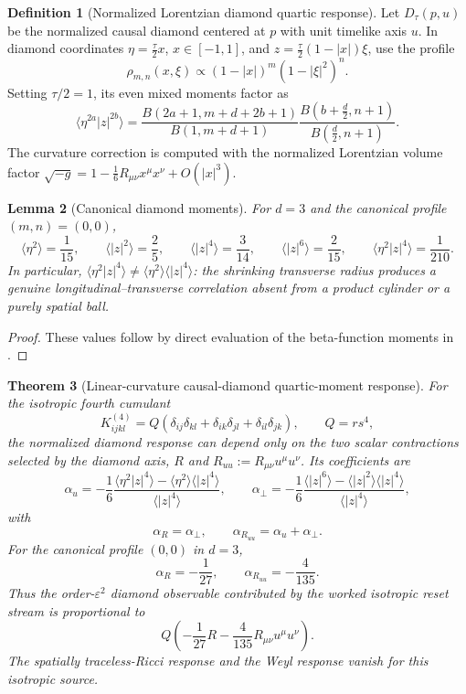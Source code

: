 \documentclass[11pt]{article}
\newtheorem{theorem}{Theorem}[section]
\newtheorem{lemma}[theorem]{Lemma}
\theoremstyle{definition}
\newtheorem{definition}[theorem]{Definition}
\theoremstyle{remark}
\newcommand{\eps}{\varepsilon}
\begin{document}
\begin{definition}[Normalized Lorentzian diamond quartic response]
\label{def:diamond-quartic-response}
Let $D_\tau(p,u)$ be the normalized causal diamond centered at $p$ with unit
timelike axis $u$.  In diamond coordinates
$\eta=\frac{\tau}{2}x$, $x\in[-1,1]$, and
$z=\frac{\tau}{2}(1-|x|)\xi$, use the profile
\[
 \rho_{m,n}(x,\xi)\propto
 (1-|x|)^m(1-|\xi|^2)^n .
\]
Setting $\tau/2=1$, its even mixed moments factor as
\[
 \langle\eta^{2a}|z|^{2b}\rangle
 =
 \frac{B(2a+1,m+d+2b+1)}{B(1,m+d+1)}
 \frac{B(b+\frac d2,n+1)}{B(\frac d2,n+1)} .
\]
The curvature correction is computed with the normalized Lorentzian volume
factor
$\sqrt{-g}=1-\frac16R_{\mu\nu}x^\mu x^\nu+O(|x|^3)$.
\end{definition}

\begin{lemma}[Canonical diamond moments]
\label{lem:canonical-diamond-moments}
For $d=3$ and the canonical profile $(m,n)=(0,0)$,
\[
 \langle\eta^2\rangle=\frac1{15},\qquad
 \langle|z|^2\rangle=\frac25,\qquad
 \langle|z|^4\rangle=\frac3{14},\qquad
 \langle|z|^6\rangle=\frac2{15},\qquad
 \langle\eta^2|z|^4\rangle=\frac1{210}.
\]
In particular,
$\langle\eta^2|z|^4\rangle\ne
 \langle\eta^2\rangle\langle|z|^4\rangle$:
the shrinking transverse radius produces a genuine longitudinal--transverse
correlation absent from a product cylinder or a purely spatial ball.
\end{lemma}

\begin{proof}
These values follow by direct evaluation of the beta-function moments in
.
\end{proof}

\begin{theorem}[Linear-curvature causal-diamond quartic-moment response]
\label{thm:diamond-linear-response}
For the isotropic fourth cumulant
\[
 K^{(4)}_{ijkl}
 =Q(\delta_{ij}\delta_{kl}+\delta_{ik}\delta_{jl}
      +\delta_{il}\delta_{jk}),\qquad Q=rs^4,
\]
the normalized diamond response can depend only on the two scalar contractions
selected by the diamond axis, $R$ and
$R_{uu}:=R_{\mu\nu}u^\mu u^\nu$.  Its coefficients are
\[
 \alpha_u=-\frac16
 \frac{\langle\eta^2|z|^4\rangle
 -\langle\eta^2\rangle\langle|z|^4\rangle}
 {\langle|z|^4\rangle},
 \qquad
 \alpha_\perp=-\frac16
 \frac{\langle|z|^6\rangle
 -\langle|z|^2\rangle\langle|z|^4\rangle}
 {\langle|z|^4\rangle},
\]
with
\[
 \alpha_R=\alpha_\perp,\qquad
 \alpha_{R_{uu}}=\alpha_u+\alpha_\perp .
\]
For the canonical profile $(0,0)$ in $d=3$,
\[
 \boxed{\alpha_R=-\frac1{27},\qquad
 \alpha_{R_{uu}}=-\frac4{135}.}
\]
Thus the order-$\eps^2$ diamond observable contributed by the worked isotropic
reset stream is proportional to
\[
 Q\left(-\frac1{27}R-\frac4{135}R_{\mu\nu}u^\mu u^\nu\right).
\]
The spatially traceless-Ricci response and the Weyl response vanish for this
isotropic source.
\end{theorem}
\end{document}
